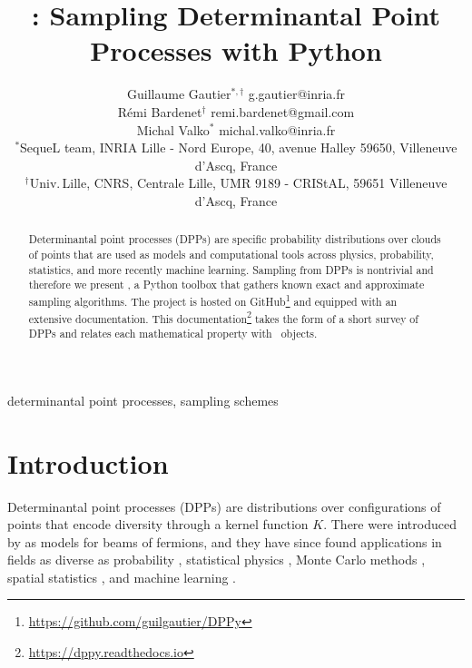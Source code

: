 \documentclass[twoside,11pt]{article}
\begin{document}
\title{\DPPy: Sampling Determinantal Point Processes with Python}

\author{\name Guillaume Gautier$^{*,\dagger}$ \email g.gautier@inria.fr \\
       \name R\'emi Bardenet$^\dagger$ \email remi.bardenet@gmail.com \\
       \name Michal Valko$^*$ \email michal.valko@inria.fr\\
       \addr $^*$SequeL team, INRIA Lille - Nord Europe,  40, avenue Halley 59650, Villeneuve d'Ascq, France\\
       \addr $^\dagger$Univ.\,Lille, CNRS, Centrale Lille, UMR 9189 - CRIStAL, 59651 Villeneuve d'Ascq, France
}

\editor{}

\maketitle

\setcounter{footnote}{3}
\begin{abstract}%
  Determinantal point processes (DPPs) are specific probability distributions over clouds of points that are used as models and computational tools across physics, probability, statistics, and more recently machine learning.
  Sampling from DPPs is nontrivial and therefore we present \DPPy, a Python toolbox that gathers known exact and approximate sampling algorithms.
  The project is hosted on GitHub\footnote{\label{fn:github}\url{https://github.com/guilgautier/DPPy}} and equipped with an extensive documentation.
  This documentation\footnote{\label{fn:docs}\url{https://dppy.readthedocs.io}} takes the form of a short survey of DPPs and relates each mathematical property with \DPPy\ objects.
\end{abstract}

\begin{keywords}determinantal point processes, sampling schemes\end{keywords}

\section{Introduction} %
\label{sec:introduction}

  Determinantal point processes (DPPs) are distributions over configurations of points that encode diversity through a kernel function $K$.
  There were introduced by \citet{Mac75} as models for beams of fermions, and they have since found applications in fields as diverse as probability \citep{Sos00, Kon05, HKPV06}, statistical physics \citep{PaBe11}, Monte Carlo methods \citep{BaHa16}, spatial statistics \citep{LaMoRu15}, and machine learning \citep{KuTa12}.
\end{document}
